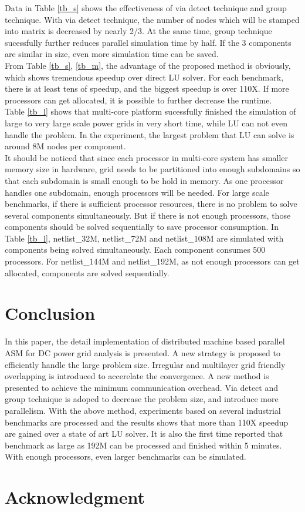 \documentclass{sig-alternate}
\begin{document}
	Data in Table \ref{tb_s} shows the effectiveness of via detect technique and group technique. With via detect technique, the 
	number of nodes which will be stamped into matrix is decreased by nearly 2/3. At the same time, group technique sucessfully
	further reduces parallel simulation time by half. If the 3 components are similar in size, even more simulation time can be
	saved.\\

	From Table \ref{tb_s}, \ref{tb_m}, the advantage of the proposed method is obviously, which shows tremendous 
	speedup over direct LU solver. For each benchmark, there is at least tens of speedup, and the biggest speedup is over 110X. 
	If more processors can get allocated, it is possible to further decrease the runtime.\\

	Table \ref{tb_l} shows that multi-core platform sucessfully finished the simulation of large to very large scale power grids
	in very short time, while LU can not even handle the problem. In the experiment, the largest problem that LU can solve is 
	around 8M nodes per component.\\ 

	It should be noticed that since each processor in multi-core system has smaller memory size in hardware, grid needs to be 
	partitioned into enough subdomains so that each subdomain is small enough to be hold in memory. As one processor handles one 
	subdomain, enough processors will be needed. For large scale benchmarks, if there is sufficient processor resources, there is
	no problem to solve several components simultaneously. But if there is not enough processors, those components should be 
	solved sequentially to save processor consumption. In Table \ref{tb_l}, netlist\_32M, netlist\_72M and netlist\_108M are 
	simulated with components being solved simultaneously. Each component consumes 500 processors. For netlist\_144M and 
	netlist\_192M, as not enough processors can get allocated, components are solved sequentially.\\

\section{Conclusion}
	In this paper, the detail implementation of distributed machine based parallel ASM for DC power grid analysis is presented. 
A new strategy is proposed to efficiently handle the large problem size. Irregular and multilayer grid friendly overlapping is introduced to accerelate the convergence. A new method is presented to achieve the minimum communication overhead. Via detect and group technique is adoped to decrease the problem size, and introduce more parallelism. With the above method, experiments based on several industrial benchmarks are processed and the results shows that more than 110X speedup are gained over a state of art LU solver. It is also the first time reported that benchmark as large as 192M can be processed and finished within 5 minutes. With enough processors, even larger benchmarks can be simulated.

\section*{Acknowledgment}



\end{document}
